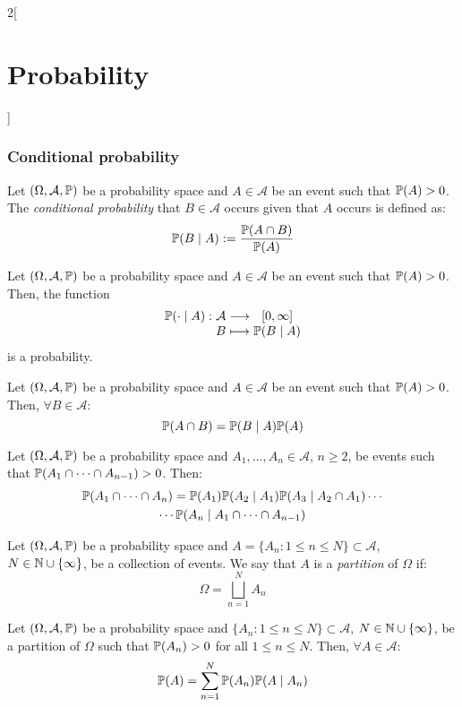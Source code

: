 \documentclass[../../../main_math.tex]{subfiles}
\begin{document}
\begin{multicols}{2}[\section{Probability}]
  \subsubsection{Conditional probability}
  \begin{definition}
    Let $(\Omega,\mathcal{A},\mathbb{P})$ be a probability space and $A\in\mathcal{A}$ be an event such that $\mathbb{P}(A)>0$. The \emph{conditional probability} that $B\in\mathcal{A}$ occurs given that $A$ occurs is defined as: $$\mathbb{P}(B\mid A):=\frac{\mathbb{P}(A\cap B)}{\mathbb{P}(A)}$$
  \end{definition}
  \begin{proposition}
    Let $(\Omega,\mathcal{A},\mathbb{P})$ be a probability space and $A\in\mathcal{A}$ be an event such that $\mathbb{P}(A)>0$. Then, the function
    $$
      \function{\Prob(\cdot\mid A)}{\mathcal{A}}{[0,\infty]}{B}{\Prob(B\mid A)}
    $$
    is a probability.
  \end{proposition}
  \begin{proposition}
    Let $(\Omega,\mathcal{A},\mathbb{P})$ be a probability space and $A\in\mathcal{A}$ be an event such that $\mathbb{P}(A)>0$. Then, $\forall B\in\mathcal{A}$: $$\mathbb{P}(A\cap B)=\mathbb{P}(B\mid A)\mathbb{P}(A)$$
  \end{proposition}
  \begin{proposition}
    Let $(\Omega,\mathcal{A},\mathbb{P})$ be a probability space and $A_1,\ldots,A_n\in\mathcal{A}$, $n\geq 2$, be events such that $\mathbb{P}(A_1\cap\cdots\cap A_{n-1})>0$. Then:
    \begin{multline*}
      \mathbb{P}(A_1\cap\cdots\cap A_n)=\mathbb{P}(A_1)\mathbb{P}(A_2\mid A_1)\mathbb{P}(A_3\mid A_2\cap A_1)\cdots\\\cdots \mathbb{P}(A_n\mid A_1\cap\cdots\cap A_{n-1})
    \end{multline*}
  \end{proposition}
  \begin{definition}
    Let $(\Omega,\mathcal{A},\mathbb{P})$ be a probability space and $A=\{A_n:1\leq n\leq N\}\subset\mathcal{A}$, $N\in\mathbb{N}\cup\{\infty\}$, be a collection of events. We say that $A$ is a \emph{partition} of $\Omega$ if: $$\Omega=\bigsqcup_{n=1}^NA_n$$
  \end{definition}
  \begin{proposition}\label{P:totalprob}
    Let $(\Omega,\mathcal{A},\mathbb{P})$ be a probability space and $\{A_n:1\leq n\leq N\}\subset\mathcal{A}$, $N\in\mathbb{N}\cup\{\infty\}$, be a partition of $\Omega$ such that $\mathbb{P}(A_n)>0$ for all $1\leq n\leq N$. Then, $\forall A\in\mathcal{A}$: $$\mathbb{P}(A)=\sum_{n=1}^N\mathbb{P}(A_n)\mathbb{P}(A\mid A_n)$$

\end{proposition}
\end{multicols}
\end{document}
